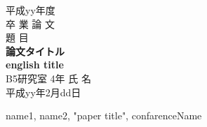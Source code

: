 \documentclass[12pt,twoside]{jreport}  %
\begin{document}
\begin{titlepage}
\parindent=0in
\begin{center}
\Large
\vspace*{3zh}
平成yy年度\\
卒 業 論 文\\
\vspace*{3zh}
題 目 \\
{\LARGE\bf
論文タイトル\\
english title\\
}
\vspace*{3zh}
B5研究室 4年 氏 名\\[1cm]
平成yy年2月dd日\\
\vspace*{5mm}
\end{center}
\end{titlepage}

\setcounter{page}{1}   %
\tableofcontents       %
\listoffigures         %
\listoftables          %
\newpage


\setcounter{page}{1}     %

\setlength{\baselineskip}{20pt}



% 





\newpage

\begin{thebibliography}{99}%
 name1, name2, "paper title", confarenceName
\end{thebibliography}
\end{document}
